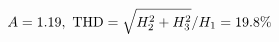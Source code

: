 \documentclass[preview]{standalone}
\begin{document}
\begin{align*}
\special{dvisvgm:raw <g id='unique000'>}A=1.19,\ \text{THD}=\sqrt{H_2^2+H_3^2}/H_1=19.8\%\special{dvisvgm:raw </g>}
\end{align*}
\end{document}
